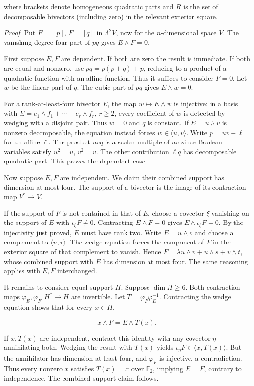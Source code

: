 where brackets denote homogeneous quadratic parts and $R$ is the set of decomposable bivectors (including zero) in the relevant exterior square.

\textit{Proof.} Put $E=[p]$, $F=[q]$ in $\Lambda^2 V$, now for the $n$-dimensional space $V$. The vanishing degree-four part of $pq$ gives $E\wedge F=0$.

First suppose $E,F$ are dependent. If both are zero the result is immediate. If both are equal and nonzero, use $pq=p(p+q)+p$, reducing to a product of a quadratic function with an affine function. Thus it suffices to consider $F=0$. Let $w$ be the linear part of $q$. The cubic part of $pq$ gives $E\wedge w=0$.

For a rank-at-least-four bivector $E$, the map $w\mapsto E\wedge w$ is injective: in a basis with $E=e_1\wedge f_1+\cdots+e_r\wedge f_r$, $r\ge2$, every coefficient of $w$ is detected by wedging with a disjoint pair. Thus $w=0$ and $q$ is constant. If $E=u\wedge v$ is nonzero decomposable, the equation instead forces $w\in\langle u,v\rangle$. Write $p=uv+\ell$ for an affine $\ell$. The product $uvq$ is a scalar multiple of $uv$ since Boolean variables satisfy $u^2=u$, $v^2=v$. The other contribution $\ell q$ has decomposable quadratic part. This proves the dependent case.

Now suppose $E,F$ are independent. We claim their combined support has dimension at most four. The support of a bivector is the image of its contraction map $V^*\to V$.

If the support of $F$ is not contained in that of $E$, choose a covector $\xi$ vanishing on the support of $E$ with $\iota_\xi F\ne0$. Contracting $E\wedge F=0$ gives $E\wedge\iota_\xi F=0$. By the injectivity just proved, $E$ must have rank two. Write $E=u\wedge v$ and choose a complement to $\langle u,v\rangle$. The wedge equation forces the component of $F$ in the exterior square of that complement to vanish. Hence $F=\lambda u\wedge v+u\wedge s+v\wedge t$, whose combined support with $E$ has dimension at most four. The same reasoning applies with $E,F$ interchanged.

It remains to consider equal support $H$. Suppose $\dim H\ge6$. Both contraction maps $\varphi_E,\varphi_F:H^*\to H$ are invertible. Let $T=\varphi_F\varphi_E^{-1}$. Contracting the wedge equation shows that for every $x\in H$,

\[x\wedge F=E\wedge T(x).\]

If $x,T(x)$ are independent, contract this identity with any covector $\eta$ annihilating both. Wedging the result with $T(x)$ yields $\iota_\eta F\in\langle x,T(x)\rangle$. But the annihilator has dimension at least four, and $\varphi_F$ is injective, a contradiction. Thus every nonzero $x$ satisfies $T(x)=x$ over $\mathbb F_2$, implying $E=F$, contrary to independence. The combined-support claim follows.

